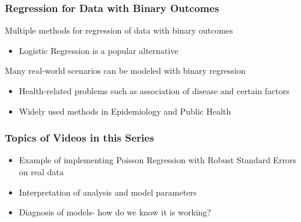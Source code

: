 \documentclass{beamer}
\begin{document}
\begin{frame}[fragile]\frametitle{Regression for Data with Binary Outcomes}

	Multiple methods for regression of data with binary outcomes
	
	\begin{itemize}
	
		\item Logistic Regression is a popular alternative
	
	\end{itemize}
	
	Many real-world scenarios can be modeled with binary regression
	
	\begin{itemize}
	
		\item Health-related problems such as association of disease and certain factors
		
		\item Widely used methods in Epidemiology and Public Health
	
	\end{itemize}
	
\end{frame}



\begin{frame}[fragile]\frametitle{Topics of Videos in this Series}
	
	\begin{itemize}
	
		\item Example of implementing Poisson Regression with Robust Standard Errors on real data
		
		\item Interpretation of analysis and model parameters
		
		\item Diagnosis of models- how do we know it is working?
	
	\end{itemize}

	
\end{frame}
\end{document}
